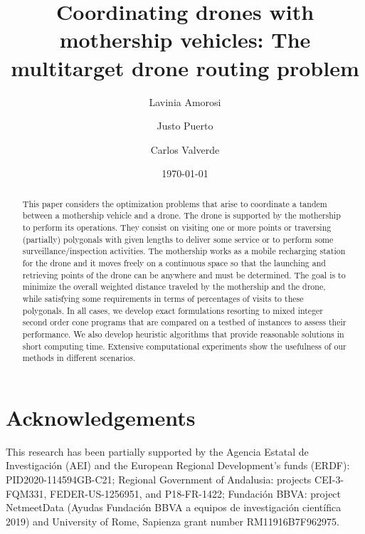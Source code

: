 \documentclass[10pt,a4paper]{elsarticle}
\title{Coordinating drones with mothership vehicles: The multitarget drone routing problem}
\author[1]{Lavinia Amorosi}
\author[2]{Justo Puerto}
\author[2]{Carlos Valverde\corref{cor1}}
\date{\today}
\begin{document}
\begin{abstract}
This paper considers the optimization problems that arise to coordinate a tandem between a mothership vehicle and a drone. The drone is supported by the mothership to perform its operations. 
They consist on visiting one or more points or traversing (partially) polygonals with given lengths to deliver some service or to perform some surveillance/inspection activities.
The mothership works as a mobile recharging station for the drone and it moves freely on a continuous space so that the launching and retrieving points of the drone can be anywhere and must be determined. 
The goal is to minimize the overall weighted distance traveled by the mothership and the drone, while satisfying some requirements in terms of percentages of visits to these polygonals. In all cases, we develop exact formulations resorting to mixed integer second order cone programs that are compared on a testbed of instances to assess their performance. We also develop  heuristic algorithms that provide reasonable solutions in short computing time.  Extensive computational experiments show the usefulness of our methods in different scenarios. 
\end{abstract}



\maketitle



%




% 

%

\section*{Acknowledgements}
This research has been partially supported by the Agencia Estatal de Investigación (AEI) and the European Regional Development’s funds (ERDF): PID2020-114594GB-C21; 
Regional Government of Andalusia: projects CEI-3-FQM331, FEDER-US-1256951, and P18-FR-1422; Fundación BBVA: project NetmeetData (Ayudas
Fundación BBVA a equipos de investigación científica 2019) and University of Rome, Sapienza grant number RM11916B7F962975.


%






\end{document}
